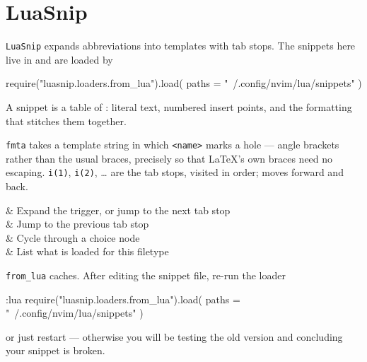 \section{LuaSnip}

\texttt{LuaSnip} \cite{luasnip} expands abbreviations into templates with tab
stops. The
snippets here live in  and are loaded by

\begin{luacode}
require("luasnip.loaders.from_lua").load({ paths = "~/.config/nvim/lua/snippets" })
\end{luacode}

A snippet is a table of : literal text, numbered insert points, and
the formatting that stitches them together.


\texttt{fmta} takes a template string in which \texttt{<name>} marks a hole ---
angle brackets rather than the usual braces, precisely so that \LaTeX's own
braces need no escaping. \texttt{i(1)}, \texttt{i(2)}, \dots{} are the tab stops,
visited in order;  moves forward and  back.

\begin{keys}[0.30]
	       & Expand the trigger, or jump to the next tab stop \\
	     & Jump to the previous tab stop                    \\
	       & Cycle through a choice node                      \\
	 & List what is loaded for this filetype  \\
\end{keys}

\begin{note}
	\texttt{from\_lua} caches. After editing the snippet file, re-run the loader
	\begin{vimcode}
:lua require("luasnip.loaders.from_lua").load({
  paths = "~/.config/nvim/lua/snippets" })
	\end{vimcode}
	or just restart --- otherwise you will be testing the old version and
	concluding your snippet is broken.
\end{note}

